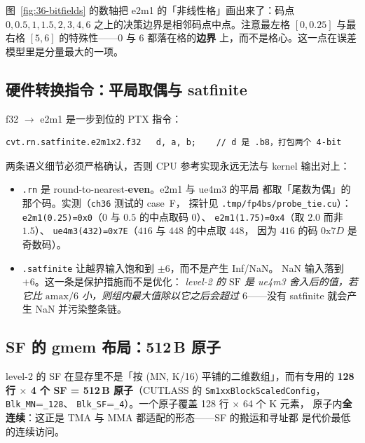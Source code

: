图~\ref{fig:36-bitfields} 的数轴把 e2m1 的「非线性格」画出来了：码点
$0,0.5,1,1.5,2,3,4,6$ 之上的决策边界是相邻码点中点。注意最左格
$[0,0.25]$ 与最右格 $[5,6]$ 的特殊性——$0$ 与 $6$ 都落在格的\textbf{边界}
上，而不是格心。这一点在误差模型里是分量最大的一项。

\subsection{硬件转换指令：平局取偶与 satfinite}

f32 $\to$ e2m1 是一步到位的 PTX 指令：

\begin{verbatim}
cvt.rn.satfinite.e2m1x2.f32   d, a, b;    // d 是 .b8，打包两个 4-bit
\end{verbatim}

两条语义细节必须严格确认，否则 CPU 参考实现永远无法与 kernel 输出对上：

\begin{itemize}[itemsep=2pt,topsep=3pt]
  \item \texttt{.rn} 是 round-to-nearest-\textbf{even}。e2m1 与 ue4m3 的平局
        都取「尾数为偶」的那个码。实测（\texttt{ch36} 测试的 case~F，
        探针见 \texttt{.tmp/fp4bs/probe\_tie.cu}）：
        \texttt{e2m1(0.25)=0x0}（$0$ 与 $0.5$ 的中点取码 0）、
        \texttt{e2m1(1.75)=0x4}（取 $2.0$ 而非 $1.5$）、
        \texttt{ue4m3(432)=0x7E}（$416$ 与 $448$ 的中点取 $448$，
        因为 $416$ 的码 $0\text{x}7D$ 是奇数码）。
  \item \texttt{.satfinite} 让越界输入饱和到 $\pm6$，而不是产生 Inf/NaN。
        NaN 输入落到 $+6$。这一条是保护措施而不是优化：
        \emph{level-2 的 $\mathrm{SF}$ 是 ue4m3 舍入后的值，若它比
        $\mathrm{amax}/6$ 小，则组内最大值除以它之后会超过 $6$}——没有
        satfinite 就会产生 NaN 并污染整条链。
\end{itemize}

\subsection{SF 的 gmem 布局：512\,B 原子}

level-2 的 SF 在显存里不是「按 (MN, K/16) 平铺的二维数组」，而有专用的
\textbf{128 行 $\times$ 4 个 SF = 512\,B 原子}（CUTLASS 的
\texttt{Sm1xxBlockScaledConfig}，\texttt{Blk\_MN}=\texttt{\_128}、
\texttt{Blk\_SF}=\texttt{\_4}）。一个原子覆盖 128 行 $\times$ 64 个 K 元素，
原子内\textbf{全连续}：这正是 TMA 与 MMA 都适配的形态——SF 的搬运和寻址都
是代价最低的连续访问。

